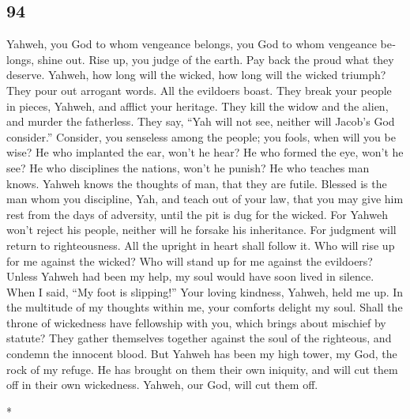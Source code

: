 \begin{paracol}{2}
\begin{otherlanguage}{english}
\hypertarget{section-187}{%
\section{94}\label{section-187}}

 Yahweh, you God to whom vengeance belongs, you God to
whom vengeance belongs, shine out.  Rise up, you judge of
the earth. Pay back the proud what they deserve.  Yahweh,
how long will the wicked, how long will the wicked triumph?
 They pour out arrogant words. All the evildoers boast.
 They break your people in pieces, Yahweh, and afflict
your heritage.  They kill the widow and the alien, and
murder the fatherless.  They say, ``Yah will not see,
neither will Jacob's God consider.''  Consider, you
senseless among the people; you fools, when will you be wise?
 He who implanted the ear, won't he hear? He who formed
the eye, won't he see?  He who disciplines the nations,
won't he punish? He who teaches man knows.  Yahweh knows
the thoughts of man, that they are futile.  Blessed is
the man whom you discipline, Yah, and teach out of your law,
 that you may give him rest from the days of adversity,
until the pit is dug for the wicked.  For Yahweh won't
reject his people, neither will he forsake his inheritance.
 For judgment will return to righteousness. All the
upright in heart shall follow it.  Who will rise up for
me against the wicked? Who will stand up for me against the evildoers?
 Unless Yahweh had been my help, my soul would have soon
lived in silence.  When I said, ``My foot is slipping!''
Your loving kindness, Yahweh, held me up.  In the
multitude of my thoughts within me, your comforts delight my soul.
 Shall the throne of wickedness have fellowship with you,
which brings about mischief by statute?  They gather
themselves together against the soul of the righteous, and condemn the
innocent blood.  But Yahweh has been my high tower, my
God, the rock of my refuge.  He has brought on them their
own iniquity, and will cut them off in their own wickedness. Yahweh, our
God, will cut them off.

\end{otherlanguage}

\switchcolumn[0]*


\end{paracol}
